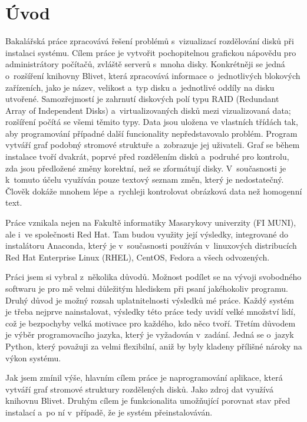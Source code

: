 \documentclass[color,table,oneside,nolot,nolof]{fithesis}
\begin{document}
\chapter{Úvod}
	Bakalářská práce zpracovává řešení problémů s~vizualizací rozdělování disků při instalaci systému. Cílem práce je vytvořit pochopitelnou grafickou nápovědu pro administrátory 
	počítačů, zvláště serverů s~mnoha disky. 
	Konkrétněji se jedná o~rozšíření knihovny Blivet, která zpracovává informace o~jednotlivých blokových zařízeních, jako je název, velikost a~typ disku 
	a~jednotlivé oddíly na disku utvořené. 
	Samozřejmostí je zahrnutí 
	diskových polí typu RAID (Redundant Array of Independent Disks)  a~virtualizovaných disků mezi vizualizovaná data; rozšíření počítá se všemi těmito typy. Data jsou uložena 
	ve vlastních třídách tak, aby programování případné další funcionality 
	nepředstavovalo problém. Program vytváří graf podobný stromové struktuře a~zobrazuje jej uživateli. Graf se během instalace tvoří dvakrát, poprvé
	před rozdělením disků a~podruhé pro kontrolu, zda jsou předložené změny korektní, než se zformátují disky. V~současnosti je k~tomuto účelu využíván pouze textový 
	seznam změn, který je nedostatečný. Člověk dokáže mnohem lépe a~rychleji kontrolovat obrázková data než homogenní text. 

	Práce vznikala nejen na Fakultě informatiky Masarykovy univerzity (FI MUNI), ale i~ve společnosti Red Hat. Tam budou využity její výsledky,
	integrované do instalátoru Anaconda, který je v~současnosti používán v~linuxových distribucích Red Hat Enterprise Linux (RHEL), CentOS, Fedora a všech
	odvozených.

	Práci jsem si vybral z~několika důvodů.  Možnost podílet se na vývoji svobodného softwaru je pro mě velmi důležitým hlediskem 
	při psaní jakéhokoliv programu. Druhý důvod je možný rozsah uplatnitelnosti výsledků mé práce. Každý systém je třeba nejprve nainstalovat, výsledky
	této práce tedy uvidí velké množství lidí, což je bezpochyby velká motivace pro každého, kdo něco tvoří. Třetím důvodem je výběr programovacího jazyka, který je vyžadován 
	v~zadání. Jedná se o~jazyk Python, který považuji za velmi flexibilní, aniž by byly kladeny přílišné nároky na výkon systému. 

	Jak jsem zmínil výše, hlavním cílem práce je naprogramování aplikace, která vytváří graf stromové struktury rozdělených disků. Jako zdroj dat
	využívá knihovnu Blivet. 
	Druhým cílem je funkcionalita umožňující porovnat stav před instalací a~po ní v~případě, že je systém přeinstalováván.
\end{document}
